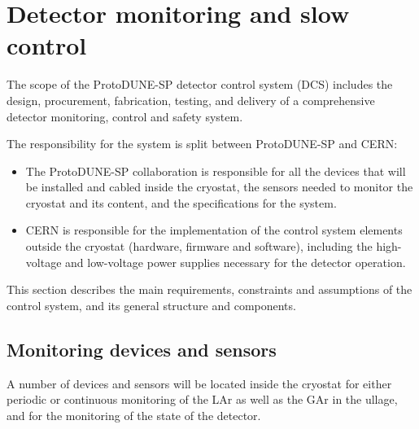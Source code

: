 \section{Detector monitoring and slow control}
\label{sec:slowcontrol}

The scope of the ProtoDUNE-SP detector control system (DCS) includes the design, procurement, fabrication, testing,
and delivery
of a comprehensive detector monitoring, control and safety system.

The responsibility for the system is split between ProtoDUNE-SP and CERN: 
\begin{itemize}
\item	The ProtoDUNE-SP collaboration is responsible for all the devices that will be installed and cabled inside 
the cryostat, the sensors needed to monitor the cryostat and its content, and the specifications for the system. %
\item	CERN is responsible for the implementation of the control system elements outside the cryostat (hardware, firmware and software), including the high-voltage and low-voltage power supplies necessary for the detector operation.
\end{itemize}

This section describes %
the main requirements, 
constraints and assumptions of the control system, and its general structure and components. 

\subsection{Monitoring devices and sensors}
\label{sec:mon-dev-sensors}

A number of %
devices and sensors will be located inside the cryostat for either periodic or continuous monitoring of %
the LAr as well as the GAr in the ullage, %
and for the monitoring of the state of the detector.


